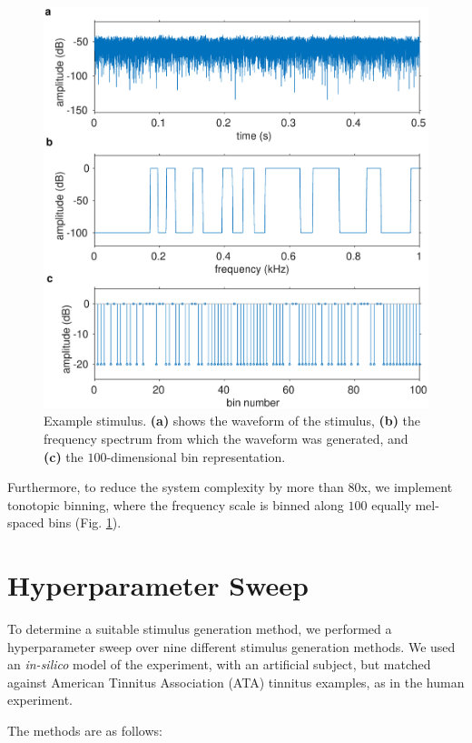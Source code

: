 \documentclass[journal]{IEEEtran}
\begin{document}
\begin{figure}[h]
	\centering
	\includegraphics[width=\linewidth]{gfx/example_stimulus.eps}
	\caption{Example stimulus. \textbf{(a)} shows the waveform of the stimulus,
  \textbf{(b)} the frequency spectrum from which the waveform was generated,
  and \textbf{(c)} the $100$-dimensional bin representation.}
	\label{fig:examplestimulus}
\end{figure}

Furthermore, to reduce the system complexity by more than 80x,
we implement tonotopic binning, where the frequency scale is binned
along $100$ equally mel-spaced bins (Fig. \ref{fig:examplestimulus}).

\section{Hyperparameter Sweep}

To determine a suitable stimulus generation method,
we performed a hyperparameter sweep over
nine different stimulus generation methods.
We used an \textit{in-silico} model of the experiment,
with an artificial subject, but matched against American Tinnitus Association (ATA) tinnitus examples,
as in the human experiment.

The methods are as follows:
\end{document}
